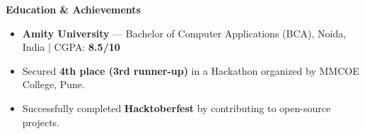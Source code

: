\documentclass[10pt]{article}
\newcommand{\sectiontitle}[1]{%
  \par\vspace{8pt}%
  \noindent\textbf{\large #1}\par
  \vspace{-2pt}\noindent\hrulefill\par
  \vspace{4pt}%
}
\begin{document}
\sectiontitle{Education \& Achievements}

\begin{itemize}
  \item \textbf{Amity University} --- Bachelor of Computer Applications (BCA), Noida, India | CGPA: \textbf{8.5/10}
  \item Secured \textbf{4th place (3rd runner-up)} in a Hackathon organized by MMCOE College, Pune.
  \item Successfully completed \textbf{Hacktoberfest} by contributing to open-source projects.
\end{itemize}
\end{document}
